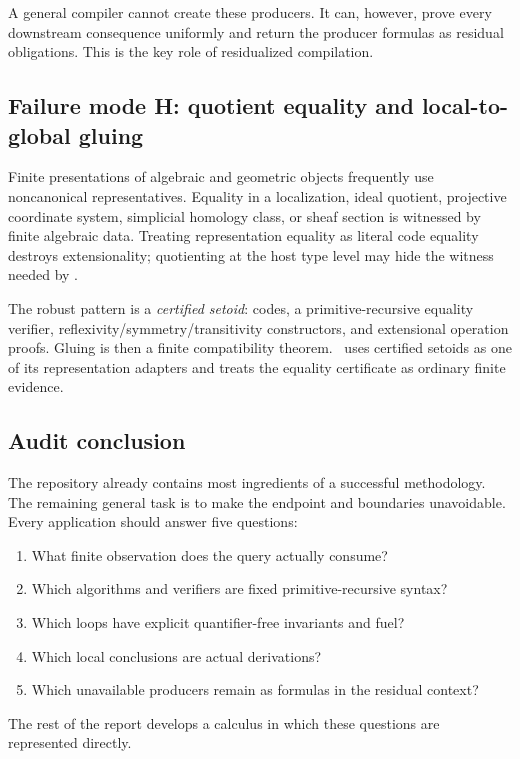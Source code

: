 A general compiler cannot create these producers.  It can, however, prove every downstream consequence uniformly and return the producer formulas as residual obligations.  This is the key role of residualized compilation.

\subsection{Failure mode H: quotient equality and local-to-global gluing}

Finite presentations of algebraic and geometric objects frequently use noncanonical representatives.  Equality in a localization, ideal quotient, projective coordinate system, simplicial homology class, or sheaf section is witnessed by finite algebraic data.  Treating representation equality as literal code equality destroys extensionality; quotienting at the host type level may hide the witness needed by \iPRA.

The robust pattern is a \emph{certified setoid}: codes, a primitive-recursive equality verifier, reflexivity/symmetry/transitivity constructors, and extensional operation proofs.  Gluing is then a finite compatibility theorem.  \CIFER\ uses certified setoids as one of its representation adapters and treats the equality certificate as ordinary finite evidence.

\subsection{Audit conclusion}

The repository already contains most ingredients of a successful methodology.  The remaining general task is to make the endpoint and boundaries unavoidable.  Every application should answer five questions:

\begin{enumerate}
\item What finite observation does the query actually consume?
\item Which algorithms and verifiers are fixed primitive-recursive syntax?
\item Which loops have explicit quantifier-free invariants and fuel?
\item Which local conclusions are actual  derivations?
\item Which unavailable producers remain as formulas in the residual context?
\end{enumerate}

The rest of the report develops a calculus in which these questions are represented directly.
